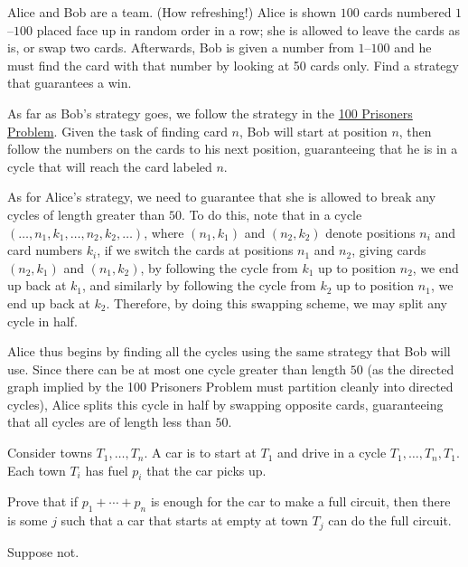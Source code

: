 \documentclass[10pt]{mypackage}
\begin{document}
\begin{problem}
  Alice and Bob are a team. (How refreshing!) Alice is shown $100$ cards numbered $1$--$100$ placed face up in random order in a row; she is allowed to leave the cards as is, or swap two cards. Afterwards, Bob is given a number from $1$--$100$ and he must find the card with that number by looking at 50 cards only. Find a strategy that guarantees a win.
\end{problem}
\begin{solution}
  As far as Bob's strategy goes, we follow the strategy in the \href{https://en.wikipedia.org/wiki/100_prisoners_problem}{100 Prisoners Problem}. Given the task of finding card $n$, Bob will start at position $n$, then follow the numbers on the cards to his next position, guaranteeing that he is in a cycle that will reach the card labeled $n$.\newline

  As for Alice's strategy, we need to guarantee that she is allowed to break any cycles of length greater than $50$. To do this, note that in a cycle $\left(\dots, n_1,k_1,\dots,n_2,k_2,\dots \right)$, where $\left( n_1,k_1 \right)$ and $\left( n_2,k_2 \right)$ denote positions $n_i$ and card numbers $k_i$, if we switch the cards at positions $n_1$ and $n_2$, giving cards $\left( n_2,k_1 \right)$ and $\left( n_1,k_2 \right)$, by following the cycle from $k_1$ up to position $n_2$, we end up back at $k_1$, and similarly by following the cycle from $k_2$ up to position $n_1$, we end up back at $k_2$. Therefore, by doing this swapping scheme, we may split any cycle in half.\newline

  Alice thus begins by finding all the cycles using the same strategy that Bob will use. Since there can be at most one cycle greater than length $50$ (as the directed graph implied by the 100 Prisoners Problem must partition cleanly into directed cycles), Alice splits this cycle in half by swapping opposite cards, guaranteeing that all cycles are of length less than $50$.
\end{solution}

\begin{problem}
  Consider towns $T_1,\dots,T_n$. A car is to start at $T_1$ and drive in a cycle $T_1,\dots,T_n,T_1$. Each town $T_i$ has fuel $p_i$ that the car picks up.\newline

  Prove that if $p_1+\cdots+p_n$ is enough for the car to make a full circuit, then there is some $j$ such that a car that starts at empty at town $T_j$ can do the full circuit.
\end{problem}
\begin{solution}
  Suppose not.
\end{solution}
\end{document}
